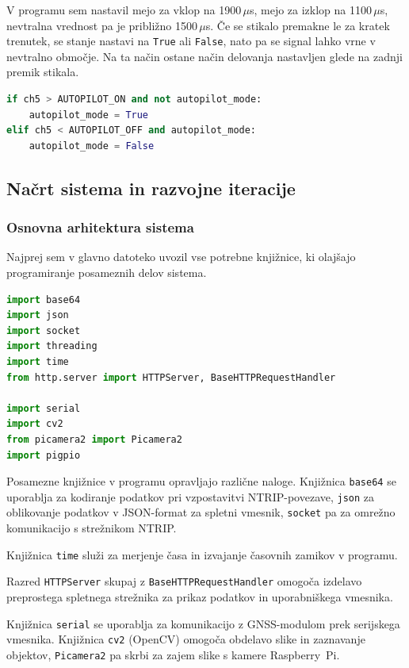 \documentclass[12pt]{article}
\begin{document}
V programu sem nastavil mejo za vklop na 1900\,$\mu$s, mejo za izklop
na 1100\,$\mu$s, nevtralna vrednost pa je približno 1500\,$\mu$s. Če se
stikalo premakne le za kratek trenutek, se stanje nastavi na
\texttt{True} ali \texttt{False}, nato pa se signal lahko vrne v
nevtralno območje. Na ta način ostane način delovanja nastavljen glede
na zadnji premik stikala.

\begin{lstlisting}[language=Python,
  caption={Varnostna preklopna logika glede na kanal CH5.}]
if ch5 > AUTOPILOT_ON and not autopilot_mode:
    autopilot_mode = True
elif ch5 < AUTOPILOT_OFF and autopilot_mode:
    autopilot_mode = False
\end{lstlisting}

\subsection{Načrt sistema in razvojne iteracije}

\subsubsection{Osnovna arhitektura sistema}

Najprej sem v glavno datoteko uvozil vse potrebne knjižnice, ki
olajšajo programiranje posameznih delov sistema.

\begin{lstlisting}[language=Python,
  caption={Osnovna struktura in knjižnice v final.py.}]
import base64
import json
import socket
import threading
import time
from http.server import HTTPServer, BaseHTTPRequestHandler

import serial
import cv2
from picamera2 import Picamera2
import pigpio
\end{lstlisting}

Posamezne knjižnice v programu opravljajo različne naloge. Knjižnica
\texttt{base64} se uporablja za kodiranje podatkov pri vzpostavitvi
NTRIP-povezave, \texttt{json} za oblikovanje podatkov v JSON-format
za spletni vmesnik, \texttt{socket} pa za omrežno komunikacijo s
strežnikom NTRIP.

Knjižnica \texttt{time} služi za merjenje časa in izvajanje časovnih
zamikov v programu.

Razred \texttt{HTTPServer} skupaj z \texttt{BaseHTTPRequestHandler}
omogoča izdelavo preprostega spletnega strežnika za prikaz podatkov
in uporabniškega vmesnika.

Knjižnica \texttt{serial} se uporablja za komunikacijo z GNSS-modulom
prek serijskega vmesnika. Knjižnica \texttt{cv2} (OpenCV) omogoča
obdelavo slike in zaznavanje objektov, \texttt{Picamera2} pa skrbi za
zajem slike s kamere Raspberry~Pi.
\end{document}
